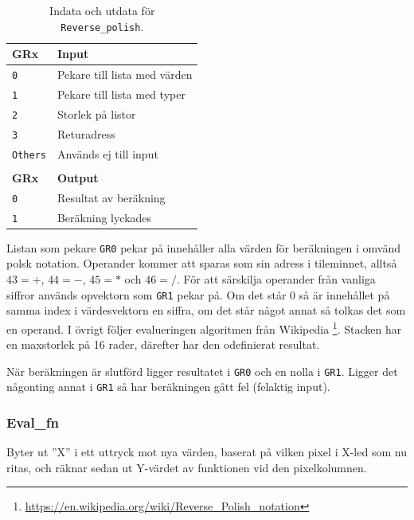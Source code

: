 \documentclass[]{article}
\begin{document}
\begin{table}[H]
\centering
\begin{tabular}{ll}
	\textbf{GRx}    & \textbf{Input}               \\ \hline
	\texttt{0}      & Pekare till lista med värden \\
	\texttt{1}      & Pekare till lista med typer  \\
	\texttt{2}      & Storlek på listor            \\
	\texttt{3}      & Returadress                  \\
	\texttt{Others} & Används ej till input        \\
	                &  \\
	\textbf{GRx}    & \textbf{Output}              \\ \hline
	\texttt{0}      & Resultat av beräkning        \\
	\texttt{1}      & Beräkning lyckades
\end{tabular}
\caption{Indata och utdata för \texttt{Reverse\_polish}.}
\end{table}

\noindent
Listan som pekare \texttt{GR0} pekar på innehåller alla värden för beräkningen i omvänd polsk notation. Operander kommer att sparas som sin adress i tileminnet, alltså $43=+$, $44=-$, $45=*$ och $46=/$. För att särskilja operander från vanliga siffror används opvektorn som \texttt{GR1} pekar på. Om det står 0 så är innehållet på samma index i värdesvektorn en siffra, om det står något annat så tolkas det som en operand. I övrigt följer evalueringen algoritmen från Wikipedia \footnote{\href{https://en.wikipedia.org/wiki/Reverse_Polish_notation\#Postfix_algorithm}{\url{https://en.wikipedia.org/wiki/Reverse_Polish_notation}}}. Stacken har en maxstorlek på 16 rader, därefter har den odefinierat resultat. 

När beräkningen är slutförd ligger resultatet i \texttt{GR0} och en nolla i \texttt{GR1}. Ligger det någonting annat i \texttt{GR1} så har beräkningen gått fel (felaktig input).

\newpage
\subsubsection{Eval\_fn}
\label{sec:evalfn}

Byter ut ''X'' i ett uttryck mot nya värden, baserat på vilken pixel i X-led som nu ritas, och räknar sedan ut Y-värdet av funktionen vid den pixelkolumnen.
\end{document}
